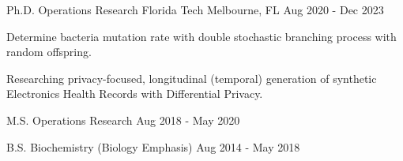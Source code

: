 \vspace{-2mm}
\vspace{-2mm}

\begin{cventries}

	\cventry
	{Ph.D. Operations Research}
	{Florida Tech}
	{Melbourne, FL}
	{Aug 2020 - Dec 2023}
	{\begin{cvitems}
			\item {Determine bacteria mutation rate with double stochastic branching process with random offspring.}
			\item {Researching privacy-focused, longitudinal (temporal) generation of synthetic Electronics Health Records with Differential Privacy.}
		\end{cvitems}}

	\vspace{-2mm}

	\cventry
	{M.S. Operations Research}
	{}
	{}
	{Aug 2018 - May 2020}
	{}
	\vspace{-7mm}

	\cventry
	{B.S. Biochemistry (Biology Emphasis)}
	{}
	{}
	{Aug 2014 - May 2018}
	{}
	\vspace{-7mm}

\end{cventries}